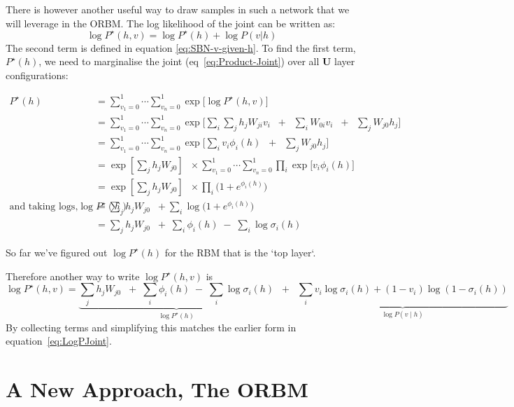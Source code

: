 There is however another useful way to draw samples in such a network that we will leverage in the ORBM. The log likelihood of the joint can be written as:
\begin{equation}\label{eq:Product-Joint}
\log P^\star(h,v) = \log P^\star(h) + \log P(v|h)
\end{equation}
The second term is defined in equation \ref{eq:SBN-v-given-h}. To find the first term, $P^\star(h)$, we need to marginalise the joint (eq~\ref{eq:Product-Joint}) over all $\mathbf{U}$ layer configurations:

$$
 \begin{aligned}
P^\star(h) &= \sum_{v_1=0}^1 \cdots \sum_{v_n=0}^1 \exp \bigg[  \log P^{\star}(h,v) \bigg] \\
&= \sum_{v_1=0}^1 \cdots \sum_{v_n=0}^1 \exp \bigg[  \sum_i  \sum_j h_j W_{ji} v_i \;\; + \;\; \sum_i W_{0i} v_i \;\; + \;\; \sum_j W_{j0} h_j \bigg] \\
&= \sum_{v_1=0}^1 \cdots \sum_{v_n=0}^1 \exp \bigg[  \sum_i v_i \phi_i(h)  \;\; + \;\; \sum_j W_{j0} h_j \bigg] \\
&= \exp\left[ \sum_j h_j  W_{j0} \right] \;\; \times \sum_{v_1=0}^1 \cdots \sum_{v_n=0}^1 \prod_i \exp\bigg[ v_i \phi_i(h) \bigg] \\
&= \exp\left[\sum_j h_j  W_{j0}\right] \;\; \times \prod_i \bigg( 1 + e^{\phi_i(h) } \bigg) \\
\text{and taking logs,}
\log P^\star(h) &= \sum_j h_j  W_{j0} \;\; +  \sum_i \log \bigg( 1 + e^{\phi_i(h) } \bigg)
\\
&= \sum_j h_j  W_{j0} \;\; + \; \sum_i \phi_i(h) \;  - \; \sum_i \log \sigma_i(h)
\end{aligned}
$$

So far we've figured out $\log P^\star(h)$ for the RBM that is the `top layer`.

Therefore another way to write $\log P^\star(h,v)$ is
\begin{equation}\label{eq:equivalent-rbm-log-joint}
\log P^\star(h,v) = \underbrace{\sum_j h_j  W_{j0} \;\; + \; \sum_i \phi_i(h) \;  - \; \sum_i \log \sigma_i(h)}_{\log P^\star(h)} \;\;+\;\; \underbrace{\sum_i v_i \log \sigma_i(h) + (1-v_i) \log (1 - \sigma_i(h))}_{\log P(v \mid h)}
\end{equation}
By collecting terms and simplifying this matches the earlier form in equation~\ref{eq:LogPJoint}.


\section{A New Approach, The ORBM}

